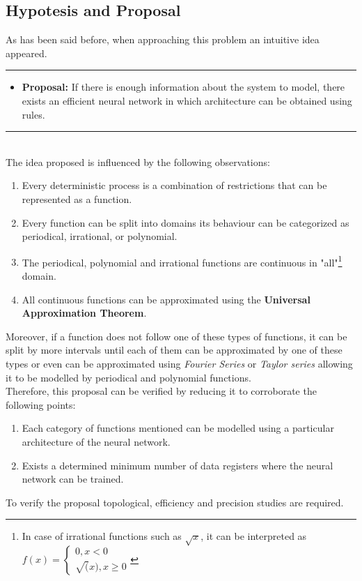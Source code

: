 \documentclass[a4paper, 11pt]{article}
\begin{document}
\subsection{Hypotesis and Proposal}
As has been said before, when approaching this problem an intuitive idea appeared. \\
\rule{\linewidth}{0.4pt}
\begin{itemize}
    \item \textbf{Proposal:} If there is enough information about the system to model, there exists an efficient neural network in which architecture can be obtained using rules.
\end{itemize}
\rule{\linewidth}{0.4pt}\\ \vspace{0.5em}
The idea proposed is influenced by the following observations:
\begin{enumerate}
    \item Every deterministic process is a combination of restrictions that can be represented as a function.
    \item Every function can be split into domains its behaviour can be categorized as periodical, irrational, or polynomial.
    \item The periodical, polynomial and irrational functions are continuous in "all"\footnote{In case of irrational functions such as $\sqrt{x}$, it can be interpreted as $f(x) = \left\{ \begin{matrix} 0, x < 0 \\ \sqrt(x), x \geq 0 \end{matrix} \right.$} domain.
    \item All continuous functions can be approximated using the \textbf{Universal Approximation Theorem}.
\end{enumerate}
Moreover, if a function does not follow one of these types of functions, it can be split by more intervals until each of them can be approximated by one of these types or even can be approximated using \textit{Fourier Series} or \textit{Taylor series} allowing it to be modelled by periodical and polynomial functions.\\
Therefore, this proposal can be verified by reducing it to corroborate the following points:
\begin{enumerate}
    \item Each category of functions mentioned can be modelled using a particular architecture of the neural network.
    \item Exists a determined minimum number of data registers where the neural network can be trained.  
\end{enumerate}
To verify the proposal topological, efficiency and precision studies are required.
\end{document}
